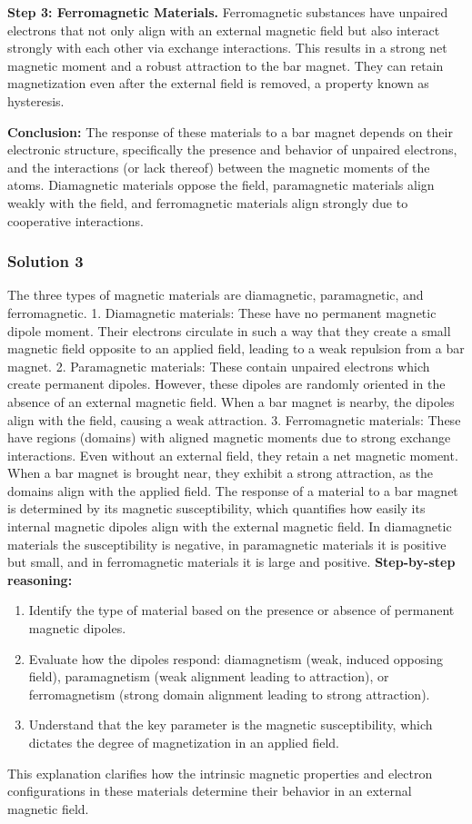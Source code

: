 \documentclass{article}
\begin{document}
\textbf{Step 3: Ferromagnetic Materials.} Ferromagnetic substances have unpaired electrons that not only align with an external magnetic field but also interact strongly with each other via exchange interactions. This results in a strong net magnetic moment and a robust attraction to the bar magnet. They can retain magnetization even after the external field is removed, a property known as hysteresis.

\textbf{Conclusion:} The response of these materials to a bar magnet depends on their electronic structure, specifically the presence and behavior of unpaired electrons, and the interactions (or lack thereof) between the magnetic moments of the atoms. Diamagnetic materials oppose the field, paramagnetic materials align weakly with the field, and ferromagnetic materials align strongly due to cooperative interactions. 

\subsubsection{Solution 3}
 The three types of magnetic materials are diamagnetic, paramagnetic, and ferromagnetic.
% 
 1. Diamagnetic materials: These have no permanent magnetic dipole moment. Their electrons circulate in such a way that they create a small magnetic field opposite to an applied field, leading to a weak repulsion from a bar magnet.
% 
 2. Paramagnetic materials: These contain unpaired electrons which create permanent dipoles. However, these dipoles are randomly oriented in the absence of an external magnetic field. When a bar magnet is nearby, the dipoles align with the field, causing a weak attraction.
% 
 3. Ferromagnetic materials: These have regions (domains) with aligned magnetic moments due to strong exchange interactions. Even without an external field, they retain a net magnetic moment. When a bar magnet is brought near, they exhibit a strong attraction, as the domains align with the applied field.
% 
 The response of a material to a bar magnet is determined by its magnetic susceptibility, which quantifies how easily its internal magnetic dipoles align with the external magnetic field. In diamagnetic materials the susceptibility is negative, in paramagnetic materials it is positive but small, and in ferromagnetic materials it is large and positive.
\textbf{Step-by-step reasoning:}
\begin{enumerate}
    \item Identify the type of material based on the presence or absence of permanent magnetic dipoles.
    \item Evaluate how the dipoles respond: diamagnetism (weak, induced opposing field), paramagnetism (weak alignment leading to attraction), or ferromagnetism (strong domain alignment leading to strong attraction).
    \item Understand that the key parameter is the magnetic susceptibility, which dictates the degree of magnetization in an applied field.
\end{enumerate}
This explanation clarifies how the intrinsic magnetic properties and electron configurations in these materials determine their behavior in an external magnetic field.
\end{document}
